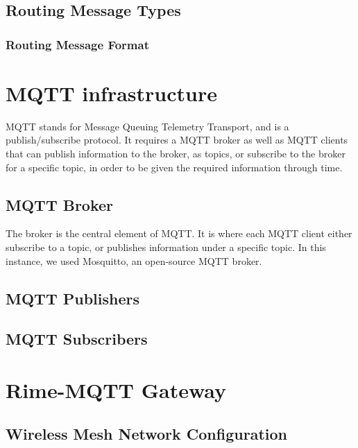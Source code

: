 \documentclass[a4paper,11pt]{article}
\begin{document}
\subsection{Routing Message Types}
\subsubsection{Routing Message Format}


\section{MQTT infrastructure}
MQTT stands for Message Queuing Telemetry Transport, and is a publish/subscribe protocol. It requires a MQTT broker as well as MQTT clients that can publish information to the broker, as topics, or subscribe to the broker for a specific topic, in order to be given the required information through time.

\subsection{MQTT Broker}
The broker is the central element of MQTT. It is where each MQTT client either subscribe to a topic, or publishes information under a specific topic. In this instance, we used Mosquitto, an open-source MQTT broker.

\subsection{MQTT Publishers}
\subsection{MQTT Subscribers}

\section{Rime-MQTT Gateway}
\subsection{Wireless Mesh Network Configuration}
\end{document}
